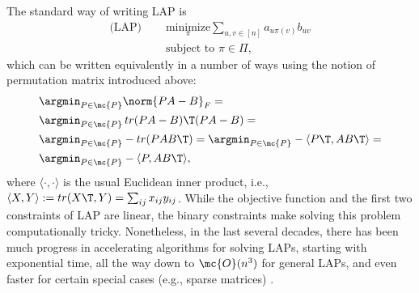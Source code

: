 \documentclass[10pt,journal,cspaper,compsoc]{IEEEtran}
\newcommand{\PmcP}{P \in \mc{P}}
\begin{document}
The standard way of writing LAP is
\begin{subequations} \label{eq:LAP}
\begin{align}
	 \text{(LAP) }\quad  &\underset{\pi}{\text{minimize}} \sum_{u,v \in [n]} a_{u \pi(v)} b_{uv} \\
	&\text{subject to } \pi \in \Pi,
\end{align}
\end{subequations}
which can be written equivalently in a number of ways using the notion of permutation matrix introduced above:
\begin{subequations} \label{eq:LAP2}
\begin{align}
	&\argmin_{\PmcP} \norm{PA - B}_F =\\
	&\argmin_{\PmcP} \, tr(PA-B)\T (PA-B)=\\ 
	&\argmin_{\PmcP}  -tr (P AB\T) = \argmin_{\PmcP}  -\langle P\T, AB\T \rangle = \label{eq:2c} \\
	&\argmin_{\PmcP}  -\langle P, AB\T \rangle, \label{eq:dotLAP}
\end{align}
\end{subequations}
where $\langle \cdot,\cdot \rangle$ %
is the usual Euclidean inner product, i.e., $\langle X,Y\rangle := tr(X\T,Y)= \sum_{ij} x_{ij} y_{ij}$.  
While the objective function and the first two constraints of LAP are linear, the binary constraints make solving this problem computationally tricky.  Nonetheless, in the last several decades, there has been much progress in accelerating algorithms for solving LAPs, starting with exponential time, all the way down to $\mc{O}(n^3)$ for general LAPs, and even faster for certain special cases (e.g., sparse matrices) \cite{Burkard2009}.
\end{document}
